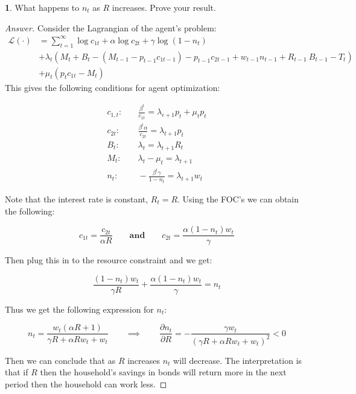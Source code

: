 \documentclass[12pt]{article}
\theoremstyle{definition}
\newtheorem{subproblem}{}[problem]
\newcommand{\qiq}{\qquad \implies \qquad}
\newcommand{\qaq}{\qquad \textbf{and} \qquad}
\begin{document}
\begin{subproblem}
    What happens to $n_{t}$ as $R$ increases. Prove your result.
\end{subproblem}
\begin{proof}[Answer]
Consider the Lagrangian of the agent's problem:
\begin{align*}
\mathcal{L}(\cdot) &= \sum_{t=1}^\infty{\log c_{1 {t}}+\alpha \log c_{2 {t}}+\gamma \log \left(1-n_{{t}}\right)} \\&+ \lambda_t\left( M_{{t}}+{B}_{{t}}- \left(M_{{t}-1}-{p}_{{t}-1} {c}_{1 {t}-1}\right)-{p}_{{t}-1} {c}_{2 {t}-1}+w_{{t}-1} {n}_{{t}-1}+{R}_{{t}-1} {~B}_{{t}-1}-{T}_{{t}}\right)\\
&+\mu_t( p_{t} c_{1 t} - M_{t})
\end{align*}
 This gives the following conditions for agent optimization:
 
 \begin{align*}
     c_{1, t}:&\quad \frac{\beta^{t}}{c_{1 t}}=\lambda_{\epsilon+1} p_{t}+\mu_{t} p_{t}\\
     c_{2 t}:&\quad  \frac{\beta^{t} \alpha}{c_{2t}}=\lambda_{t+1} p_{t}\\
     B_{t}:&\quad \lambda_{t}=\lambda_{t+1} R_{t}\\
     M_{t}:&\quad \lambda_{t}-\mu_{t}=\lambda_{t+1}\\
     n_{t}:&\quad -\frac{\beta^{t} \gamma}{1-n_{t}}=\lambda_{t+1} w_{t}
 \end{align*}

Note that the interest rate is constant, $R_t = R$. Using the FOC's we can obtain the following:

$$c_{1t} = \frac{c_{2t}}{\alpha R} \qaq c_{2t} = \frac{\alpha (1-n_t)w_t}{\gamma}$$

Then plug this in to the resource constraint and we get:

$$ \frac{(1-n_t)w_t}{\gamma R} +  \frac{\alpha (1-n_t)w_t}{\gamma} = n_t$$

Thus we get the following expression for $n_t$:

$$n_t = \frac{w_t (\alpha  R+1)}{\gamma  R+\alpha  R w_t+w_t} \qiq \frac{\partial n_t}{\partial R} = -\frac{\gamma  w_t}{(\gamma  R+\alpha  R w_t+w_t)^2}<0$$

Then we can conclude that as $R$ increases $n_t$ will decrease. The interpretation is that if $R$ then the household's savings in bonds will return more in the next period then the household can work less.


\end{proof}




% 
\end{document}
